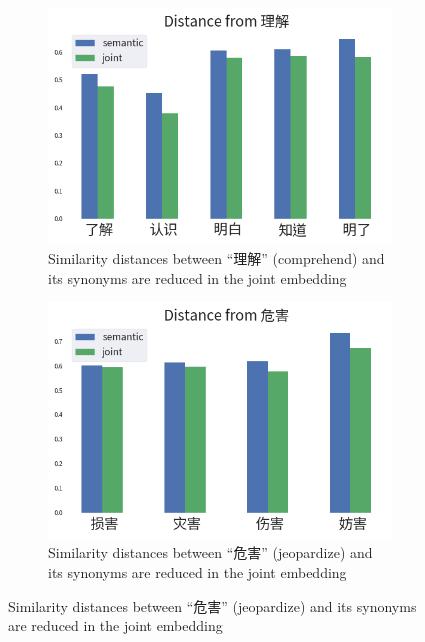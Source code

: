 \vspace{0.4cm}
\begin{figure}[h!]
    \begin{CJK}{UTF8}{gbsn}
    \centering
    \begin{subfigure}[b]{0.46\textwidth}
        \centering
        \includegraphics[width=\textwidth]{../images/similarity_zh1.png}
        \caption{Similarity distances between ``理解'' (comprehend) and its synonyms are reduced in the joint embedding}
        \label{fig:similarity_zh1}
    \end{subfigure}
    \hspace{2em}
    \begin{subfigure}[b]{0.46\textwidth}
        \centering
        \includegraphics[width=\textwidth]{../images/similarity_zh2.png}
        \caption{Similarity distances between ``危害'' (jeopardize) and its synonyms are reduced in the joint embedding}

\end{subfigure}
\end{CJK}
\end{figure}
